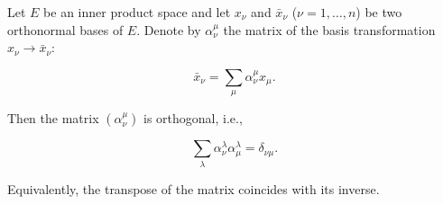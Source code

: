 Let \(E\) be an inner product space and let \(x_{\nu}\) and \(\bar{x}_{\nu}\) (\(\nu = 1, \ldots, n\)) be two orthonormal bases of \(E\). Denote by \(\alpha_{\nu}^{\mu}\) the matrix of the basis transformation \(x_{\nu} \to \bar{x}_{\nu}\):

$$\bar{x}_{\nu} = \sum_{\mu} \alpha_{\nu}^{\mu} x_{\mu}.$$

Then the matrix \((\alpha_{\nu}^{\mu})\) is orthogonal, i.e.,

$$\sum_{\lambda} \alpha_{\nu}^{\lambda} \alpha_{\mu}^{\lambda} = \delta_{\nu\mu}.$$

Equivalently, the transpose of the matrix coincides with its inverse.
